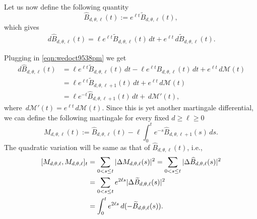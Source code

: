\documentclass[11pt]{article}
\begin{document}
Let us now define the following quantity 
\begin{equation}\label{frifeb21156pm}
\widehat{B}_{d,\theta,\ell}(t) := e^{\ell t} \widetilde{B}_{d,\theta,\ell}(t),
\end{equation}
which gives
\begin{align*}
\,d\widehat{B}_{d,\theta,\ell}(t) =\ell e^{\ell t} \widetilde{B}_{d,\theta,\ell}(t)\, dt + e^{\ell t} \,d\widetilde{B}_{d,\theta,\ell}(t).
\end{align*}



Plugging in \eqref{eqn:wedoct9538pm} we get
\begin{align*}
\,d\widehat{B}_{d,\theta,\ell}(t) &=\ell e^{\ell t} \widetilde{B}_{d,\theta,\ell}(t) \, dt -\ell e^{\ell t}B_{d,\theta,\ell}(t)\, dt +e^{\ell t} \, d\mathcal{M}(t) \\
&= \ell e^{\ell t} \widetilde{B}_{d,\theta,\ell+1}(t) \, dt +e^{\ell t} \, d\mathcal{M}(t) \\
&= \ell e^{-t}\widehat{B}_{d,\theta,\ell+1}(t)\, dt + \, d\mathcal{M'}(t),
\end{align*}
where $\, d\mathcal{M'}(t) = e^{\ell t} \,d \mathcal{M}(t)$. Since this is yet another martingale differential, we can define the following martingale for every fixed $d\geq \ell\geq 0$
\begin{equation}\label{eqn:frifeb21216pm}
M_{d,\theta,\ell}(t) := \widehat{B}_{d,\theta,\ell}(t) - \ell\int_{0}^t e^{-s}\widehat{B}_{d,\theta,\ell+1}(s) \, ds.
\end{equation}
The quadratic variation will be same  as that of $\widehat{B}_{d,\theta,\ell}(t)$, i.e.,
\begin{align}\label{eqn:satfeb22124pm}
[M_{d,\theta,\ell},M_{d,\theta,\ell}]_t &= \sum_{0<s\leq t}|\Delta M_{d,\theta,\ell}(s)|^2 = \sum_{0<s\leq t}|\Delta \widehat{B}_{d,\theta,\ell}(s)|^2 \notag \\
&=\sum_{0<s\leq t} e^{2\ell s}|\Delta \widetilde{B}_{d,\theta,\ell}(s)|^2  \notag \\
&=  \int_{0}^t e^{2\ell s} \, d(- \widetilde{B}_{d,\theta,\ell}(s)).
\end{align}
\end{document}
